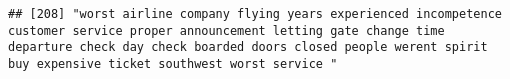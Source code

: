\documentclass[
]{article}
\begin{document}
\begin{verbatim}
## [208] "worst airline company flying years experienced incompetence customer service proper announcement letting gate change time departure check day check boarded doors closed people werent spirit buy expensive ticket southwest worst service "                                                                                                                                                                                                                                                                                                                                                                                                                                                                                                                                                                                                                                                                                                                                                                                                                                                                                                                                                                                                                                                                                                                                                                                                                                                                                                                                                                                                                                                                                                                                                   

\end{verbatim}
\end{document}

